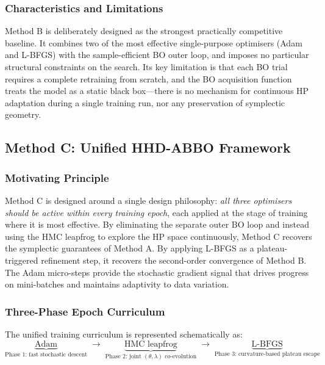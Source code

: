 \documentclass[11pt]{article}
\begin{document}
\subsubsection{Characteristics and Limitations}

Method B is deliberately designed as the strongest practically
competitive baseline.  It combines two of the most effective
single-purpose optimisers (Adam and L-BFGS) with the sample-efficient
BO outer loop, and imposes no particular structural constraints on
the search.  Its key limitation is that each BO trial requires a
complete retraining from scratch, and the BO acquisition function
treats the model as a static black box—there is no mechanism for
continuous HP adaptation during a single training run, nor any
preservation of symplectic geometry.

\subsection{Method C: Unified HHD-ABBO Framework}

\subsubsection{Motivating Principle}

Method C is designed around a single design philosophy: \emph{all
three optimisers should be active within every training epoch}, each
applied at the stage of training where it is most effective.  By
eliminating the separate outer BO loop and instead using the HMC
leapfrog to explore the HP space continuously, Method C recovers the
symplectic guarantees of Method A.  By applying L-BFGS as a
plateau-triggered refinement step, it recovers the second-order
convergence of Method B.  The Adam micro-steps provide the stochastic
gradient signal that drives progress on mini-batches and maintains
adaptivity to data variation.

\subsubsection{Three-Phase Epoch Curriculum}

The unified training curriculum is represented schematically as:
\begin{equation}
\underbrace{\text{Adam}}_{\text{Phase 1:\ fast stochastic descent}}
\;\longrightarrow\;
\underbrace{\text{HMC leapfrog}}_{\text{Phase 2:\ joint }(\theta,\lambda)\text{ co-evolution}}
\;\longrightarrow\;
\underbrace{\text{L-BFGS}}_{\text{Phase 3:\ curvature-based plateau escape}}
\label{eq:curriculum}
\end{equation}
\end{document}

